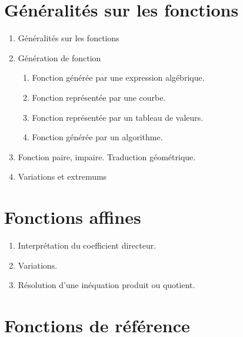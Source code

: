 \documentclass[10pt,a4paper]{article}
\begin{document}
\section{Généralités sur les fonctions}

 

\begin{enumerate}
\item Généralités sur les fonctions
\item Génération de fonction
\begin{enumerate}
\item Fonction générée par une expression algébrique.
\item Fonction représentée par une courbe.
\item Fonction représentée par un tableau de valeurs.
\item Fonction générée par un algorithme.
\end{enumerate}
\item Fonction paire, impaire. Traduction géométrique.
\item Variations et extremums
\end{enumerate}

 

\section{Fonctions affines}

 

\begin{enumerate}
\item Interprétation du coefficient directeur.
\item Variations.
\item Résolution d'une inéquation produit ou quotient.
\end{enumerate}




\section{Fonctions de référence}

 
\end{document}

